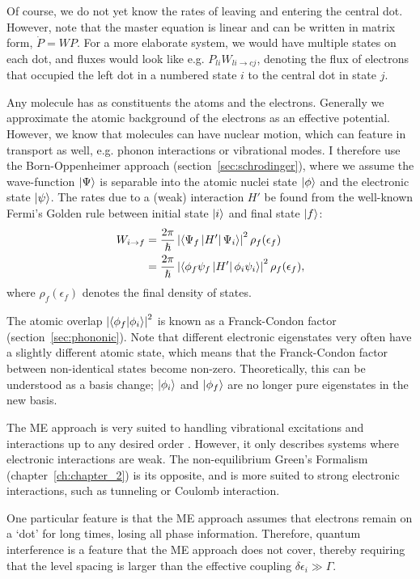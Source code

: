 Of course, we do not yet know the rates of leaving and entering the central dot. However, note that the master equation is linear and can be written in matrix form, $\dot{P} = W P$. For a more elaborate system, we would have multiple states on each dot, and fluxes would look like e.g. $P_{li} W_{li\rightarrow cj}$, denoting the flux of electrons that occupied the left dot in a numbered state $i$ to the central dot in state $j$.  

Any molecule has as constituents the atoms and the electrons. Generally we approximate the atomic background of the electrons as an effective potential. However, we know that molecules can have nuclear motion, which can feature in transport as well, e.g. phonon interactions or vibrational modes. I therefore use the Born-Oppenheimer approach (section~\ref{sec:schrodinger}), where we assume the wave-function $\ket{\Psi}$ is separable into the atomic nuclei state $\ket{\phi}$ and the electronic state $\ket{\psi}$. The rates due to a (weak) interaction $H'$ be found from the well-known Fermi's Golden rule between initial state $\ket{i}$ and final state $\ket{f}$:
\begin{align*}
W_{i\rightarrow f}  &= \frac{2\pi}{\hslash} \left| \braket{\Psi_f \left|H'\right| \Psi_i}\right|^2 \rho_f (\epsilon_f)  \\
&= \frac{2\pi}{\hslash} \left| \braket{\phi_f \psi_f \left|H'\right| \phi_i \psi_i}\right|^2 \rho_f (\epsilon_f),
\end{align*}
where $\rho_f(\epsilon_f)$ denotes the final density of states. 

The atomic overlap $\left| \braket{ \phi_f | \phi_i }\right|^2$ is known as a Franck-Condon factor (section~\ref{sec:phononic}). Note that different electronic eigenstates very often have a slightly different atomic state, which means that the Franck-Condon factor between non-identical states become non-zero. Theoretically, this can be understood as a basis change; $\ket{\phi_i}$ and $\ket{\phi_f}$ are no longer pure eigenstates in the new basis. 

The ME approach is very suited to handling vibrational excitations and interactions up to any desired order \cite{seldenthuis}. However, it only describes systems where electronic interactions are weak. The non-equilibrium Green's Formalism (chapter~\ref{ch:chapter_2}) is its opposite, and is more suited to strong electronic interactions, such as tunneling or Coulomb interaction. 

One particular feature is that the ME approach assumes that electrons remain on a `dot' for long times, losing all phase information. Therefore, quantum interference is a feature that the ME approach does not cover, thereby requiring that the level spacing is larger than the effective coupling $\delta \epsilon_i \gg \Gamma$.

